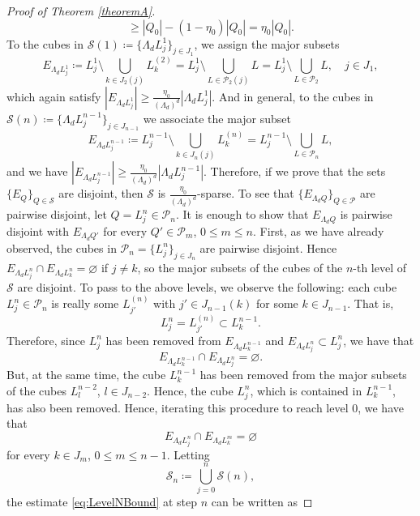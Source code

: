 \documentclass[12pt]{amsart}
\newcommand{\Ss}{\mathcal{S}}
\theoremstyle{plain}
\theoremstyle{definition} %
\numberwithin{equation}{section}
\begin{document}
\begin{proof}[Proof of Theorem \ref{theoremA}]
\[    \geq
    |Q_0|-(1-\eta_0)| Q_0|
    =
    \eta_0|Q_0|.    
\]
To the cubes in $\Ss(1)\coloneqq \{\Lambda_dL_j^{1}\}_{j\in J_1}$, we assign the major subsets
    \[
    E_{\Lambda_dL_j^{1}}
    \coloneqq 
    L_j^{1}\setminus{\bigcup_{k\in J_2(j)} L_k^{(2)}}
    =
    L_j^{1}\setminus{\bigcup_{L\in \mathcal{P}_2(j)} L}
    =
    L_j^{1}\setminus{\bigcup_{L\in \mathcal{P}_2} L},
    \quad  j\in J_1, 
    \] 
    which again satisfy $|E_{\Lambda_dL_j^{1}}|\geq \frac{\eta_0}{(\Lambda_d)^d}|\Lambda_d L_j^{1}|$. And in general, to the cubes in $\Ss(n)\coloneqq \{\Lambda_d L_j^{n-1}\}_{j\in J_{n-1}}$ we associate the major subset
    \[
    E_{\Lambda_d L_j^{n-1}}
    \coloneqq 
    L_j^{n-1}\setminus{\bigcup_{k\in J_n(j)}L_k^{(n)}}
    =
    L_j^{n-1}\setminus{\bigcup_{L\in\mathcal{P}_{n}} L}, 
    \]
    and we have $|E_{\Lambda_d L_j^{n-1}}|\geq \frac{\eta_0}{(\Lambda_d)^d}|\Lambda_d L_j^{n-1}|$. Therefore, if we prove that the sets $\{E_{Q}\}_{Q\in\mathcal{S}}$ are disjoint, then $\mathcal{S}$ is $\frac{\eta_0}{(\Lambda_d)^d}$-sparse. To see that $\{E_{\Lambda_d Q}\}_{Q\in\mathcal{P}}$ are pairwise disjoint, let $Q=L_j^n\in\mathcal{P}_n$. It is enough to show that $E_{\Lambda_d Q}$ is pairwise disjoint with $E_{\Lambda_d Q'}$ for every $Q'\in\mathcal{P}_{m}$, $0\leq m\leq n$. First, as we have already observed, the cubes in $\mathcal{P}_n=\{L_j^n\}_{j\in J_n}$ are pairwise disjoint. Hence $E_{\Lambda_d L_j^n}\cap E_{\Lambda_d L_k^n}=\varnothing $ if $j\neq k$, so the major subsets of the cubes of the $n$-th level of $\mathcal{S}$ are disjoint. To pass to the above levels, we observe the following: each cube $L_j^n\in\mathcal{P}_{n}$ is really some $L_{j'}^{(n)}$ with $j'\in J_{n-1}(k)$ for some $k\in J_{n-1}$. That is, 
    \[
    L_{j}^n
    =
    L_{j'}^{(n)}
    \subset
    L_k^{n-1}.
    \]
    Therefore, since $L_j^{n}$ has been removed from $E_{\Lambda_d L_k^{n-1}}$ and $E_{\Lambda_d L_j^{n}}\subset L_j^n$, we have that
    \[
    E_{\Lambda_d L_k^{n-1}}\cap E_{\Lambda_d L_j^{n}}
    =
    \varnothing.
    \]
    But, at the same time, the cube $L_k^{n-1}$ has been removed from the major subsets of the cubes $L_l^{n-2}$, $l\in J_{n-2}$. Hence, the cube $L_j^{n}$, which is contained in $L_k^{n-1}$, has also been removed. Hence, iterating this procedure to reach level $0$, we have that
    \[
    E_{\Lambda_d L_j^n}
    \cap 
    E_{\Lambda_d L_k^{m}}
    =
    \varnothing
    \]  
    for every $k\in J_m$, $0\leq m\leq n-1$. Letting
    \[
    \Ss_n\coloneqq\bigcup_{j=0}^{n}\Ss(n),
    \]
    the estimate \eqref{eq:LevelNBound} at step $n$ can be written as

\end{proof}
\end{document}
